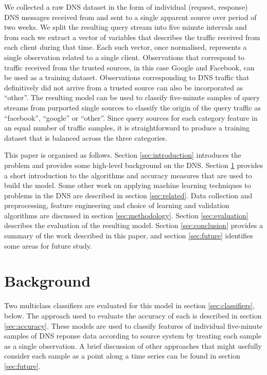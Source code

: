 \documentclass[conference]{IEEEtran}
\begin{document}
We collected a raw DNS dataset in the form of individual (request,
response) DNS messages received from and sent to a single apparent
source over period of two weeks. We split the resulting query stream
into five minute intervals and from each we extract a vector of
variables that describes the traffic received from each client during
that time. Each such vector, once normalised, represents a single
observation related to a single client. Observations that correspond to
traffic received from the trusted sources, in this case Google and
Facebook, can be used as a training dataset. Observations corresponding
to DNS traffic that definitively did not arrive from a trusted source
can also be incorporated as ``other''. The resulting model can be used
to classify five-minute samples of query streams from purported single
sources to classify the origin of the query traffic as ``facebook'',
``google'' or ``other''. Since query sources for each category feature
in an equal number of traffic samples, it is straightforward to produce
a training dataset that is balanced across the three categories.

This paper is organised as follows. Section \ref{sec:introduction}
introduces the problem and provides some high-level background on the
DNS. Section \ref{sec:background} provides a short introduction to the
algorithms and accuracy measures that are used to build the model. Some
other work on applying machine learning techniques to problems in the
DNS are described in section \ref{sec:related}. Data collection and
preprocessing, feature engineering and choice of learning and validation
algorithms are discussed in section \ref{sec:methodology}. Section
\ref{sec:evaluation} describes the evaluation of the resulting model.
Section \ref{sec:conclusion} provides a summary of the work described in
this paper, and section \ref{sec:future} identifies some areas for
future study.

\section{Background}\label{sec:background}

\label{sec:background}

Two multiclass classifiers are evaluated for this model in section
\ref{sec:classifiers}, below. The approach used to evaluate the accuracy
of each is described in section \ref{sec:accuracy}. These models are
used to classify features of individual five-minute samples of DNS
reponse data according to source system by treating each sample as a
single observation. A brief discussion of other approaches that might
usefully consider each sample as a point along a time series can be
found in section \ref{sec:future}.
\end{document}
